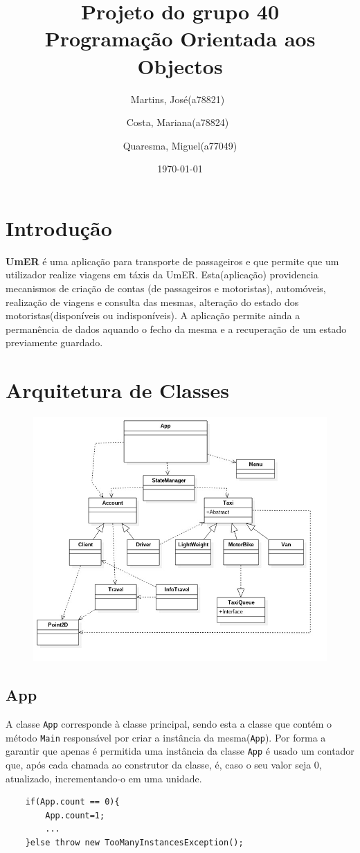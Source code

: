 \documentclass[a4paper,10pt,portuguese]{article}
\title{Projeto do grupo 40 \\ Programação Orientada aos Objectos}
\author{Martins, José(a78821)\
        \and
        Costa, Mariana(a78824)\
        \and
        Quaresma, Miguel(a77049)
        }
\date{\today}
\begin{document}
\begin{titlepage}
\maketitle
\end{titlepage}
 
\tableofcontents

\newpage

\section{Introdução}
\textbf{UmER} é uma aplicação para transporte de passageiros e que permite que um utilizador realize viagens em táxis da UmER. Esta(aplicação) providencia mecanismos de criação de contas (de passageiros e motoristas), automóveis, realização de viagens e consulta das mesmas, alteração do estado dos motoristas(disponíveis ou indisponíveis). A aplicação permite ainda a permanência de dados aquando o fecho da mesma e a recuperação de um estado previamente guardado.

\newpage

\section{Arquitetura de Classes}

\begin{figure}[ht!]
    \centering
        \includegraphics[width=120mm]{graph.jpg}
\end{figure}

\subsection{App}
A classe \texttt{App} corresponde à classe principal, sendo esta a classe que contém o método \texttt{Main} responsável por criar a instância da mesma(\texttt{App}).
Por forma a garantir que apenas é permitida uma instância da classe \texttt{App} é usado um contador que, após cada chamada ao construtor da classe, é, caso o seu valor seja 0, atualizado, incrementando-o em uma unidade. 
\begin{verbatim}
	if(App.count == 0){ 
        App.count=1;
        ...
    }else throw new TooManyInstancesException();
\end{verbatim}
\end{document}
